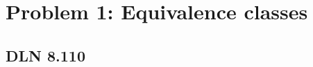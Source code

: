 \documentclass[titlepage]{article}
\begin{document}
 \maketitle

\section{Problem 1: Equivalence classes}


\subsection{DLN 8.110}  %
\end{document}
